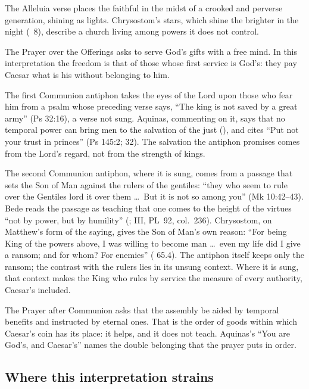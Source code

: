 The Alleluia verse places the faithful in the midst of a crooked and perverse
generation, shining as lights. Chrysostom's stars, which shine the brighter in
the night (~8), describe a church living among
powers it does not control.

The Prayer over the Offerings asks to serve God's gifts with a free mind. In
this interpretation the freedom is that of those whose first service is God's:
they pay Caesar what is his without belonging to him.

The first Communion antiphon takes the eyes of the Lord upon those who fear
him from a psalm whose preceding verse says, ``The king is not saved by a great
army'' (Ps 32:16), a verse not sung. Aquinas, commenting on it, says that no temporal power can bring men to the salvation of the just
(), and cites ``Put not your trust in princes'' (Ps 145:2;
 32). The salvation the antiphon promises comes
from the Lord's regard, not from the strength of kings.

The second Communion antiphon, where it is sung, comes from a passage that
sets the Son of Man against the rulers of the gentiles: ``they who seem to rule
over the Gentiles lord it over them \ldots\ But it is not so among you'' (Mk
10:42--43). Bede reads the passage as teaching that one comes to the height of
the virtues ``not by power, but by humility'' (;  III, PL~92, col.~236). Chrysostom, on Matthew's form of the saying,
gives the Son of Man's own reason: ``For being King of the powers above, I was
willing to become man \ldots\ even my life did I give a ransom; and for whom?
For enemies'' ( 65.4). The antiphon itself keeps only
the ransom; the contrast with the rulers lies in its unsung context. Where it
is sung, that context makes the King who rules by service the measure of every
authority, Caesar's included.

The Prayer after Communion asks that the assembly be aided by temporal benefits
and instructed by eternal ones. That is the order of goods within which
Caesar's coin has its place: it helps, and it does not teach. Aquinas's ``You
are God's, and Caesar's'' names the double belonging that the prayer puts in
order.

\subsection{Where this interpretation strains}

